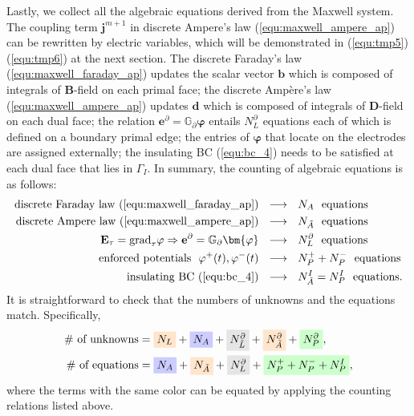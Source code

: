 \documentclass{article}
\begin{document}
Lastly, we collect all the algebraic equations derived from the Maxwell system. The coupling term $\mathbf{j}^{m+1}$ in discrete Ampere's law (\ref{equ:maxwell_ampere_ap}) can be rewritten by electric variables, which will be demonstrated in (\ref{equ:tmp5})(\ref{equ:tmp6}) at the next section. The discrete Faraday's law (\ref{equ:maxwell_faraday_ap}) updates the scalar vector $\mathbf{b}$ which is composed of integrals of $\mathbf{B}$-field on each primal face; the discrete Amp\`{e}re's law (\ref{equ:maxwell_ampere_ap}) updates $\mathbf{d}$ which is composed of integrals of $\mathbf{D}$-field on each dual face; the relation $\mathbf{e}^\partial = \mathbb{G}_\partial \bm{\varphi}$ entails $N^\partial_L$ equations each of which is defined on a boundary primal edge; the entries of $\bm{\varphi}$ that locate on the electrodes are assigned externally; the insulating BC (\ref{equ:bc_4}) needs to be satisfied at each dual face that lies in $\Gamma_I$. In summary, the counting of algebraic equations is as follows:
\begin{align*}
    \text{discrete Faraday law (\ref{equ:maxwell_faraday_ap})} \ \ &\longrightarrow\ \  N_A \ \ \text{equations} \\
    \text{discrete Ampere law (\ref{equ:maxwell_ampere_ap})} \ \ &\longrightarrow\ \  N_{\Tilde{A}} \ \ \text{equations} \\
     \mathbf{E}_\tau = \text{grad}_\tau \varphi \Rightarrow \mathbf{e}^\partial = \mathbb{G}_\partial \bm{\varphi} \ \ &\longrightarrow\ \  N^\partial_L \ \ \text{equations} \\
    \text{enforced potentials}\ \ \varphi^+(t), \varphi^-(t) \ \ &\longrightarrow\ \  N_P^+ + N_P^- \ \ \text{equations} \\
    \text{insulating BC (\ref{equ:bc_4})} \ \ &\longrightarrow\ \  N_{\Tilde{A}}^I = N_P^I \ \ \text{equations}.
\end{align*}
It is straightforward to check that the numbers of unknowns and the equations match. Specifically, 
\begin{align*}
    \#\text{ of unknowns} &= \colorbox{orange!20}{$N_L$} + \colorbox{blue!20}{$N_A$} + \colorbox{gray!20}{$N_{\Tilde{L}}^\partial$} + \colorbox{orange!20}{$N_{\Tilde{A}}^\partial$} + \colorbox{green!20}{$N_P^\partial$}, \\
    \#\text{ of equations} &= \colorbox{blue!20}{$N_A$} + \colorbox{orange!20}{$N_{\Tilde{A}}$} + \colorbox{gray!20}{$N_L^\partial$} + \colorbox{green!20}{$N_P^+ + N_P^- + N_P^I$},
\end{align*}
where the terms with the same color can be equated by applying the counting relations listed above.
\end{document}
